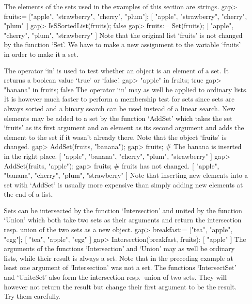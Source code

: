 The elements of the sets used in the examples of this section are
strings.
\beginexample
gap> fruits:= ["apple", "strawberry", "cherry", "plum"];
[ "apple", "strawberry", "cherry", "plum" ]
gap> IsSSortedList(fruits);
false
gap> fruits:= Set(fruits);
[ "apple", "cherry", "plum", "strawberry" ] 
\endexample
Note  that the  original list `fruits'  is not  changed  by the  function
`Set'.
We have to make a new assignment to the variable `fruits'
in order to make it a set.

The operator `in' is  used  to test whether an  object is an element of a
set.  It returns a boolean value `true' or `false'.
\beginexample
gap> "apple" in fruits;
true
gap> "banana" in fruits;
false 
\endexample
The operator `in' may as well be applied to ordinary lists. It is however
much faster to perform  a membership test for sets  since sets are always
sorted and a binary  search can be used instead  of a linear search.  New
elements may be added to a  set by the function  `AddSet' which takes the
set `fruits' as its first argument and an  element as its second argument
and adds the element to the set if it wasn't already there. Note that the
object `fruits' is changed.
\beginexample
gap> AddSet(fruits, "banana");
gap> fruits;  #  The banana is inserted in the right place.
[ "apple", "banana", "cherry", "plum", "strawberry" ]
gap> AddSet(fruits, "apple");
gap> fruits;  #  fruits has not changed.
[ "apple", "banana", "cherry", "plum", "strawberry" ] 
\endexample
Note that inserting new elements into a set with `AddSet' is usually more
expensive than simply adding new elements at the end of a list.

Sets can be intersected by the function `Intersection'  and united by the
function `Union' which both take  two sets as their arguments  and return
the intersection resp. union of the two sets as a new object.
\beginexample
gap> breakfast:= ["tea", "apple", "egg"];
[ "tea", "apple", "egg" ]
gap> Intersection(breakfast, fruits);
[ "apple" ] 
\endexample
The arguments of the functions `Intersection' and `Union'  may as well be
ordinary lists,  while  their result is  always  a set. Note that  in the
preceding example at least one argument of  `Intersection' was not a set.
The functions `IntersectSet'  and `UniteSet'  also form the  intersection
resp.~union  of  two sets. They  will  however not return  the result but
change their first argument to be the result. Try them carefully.


